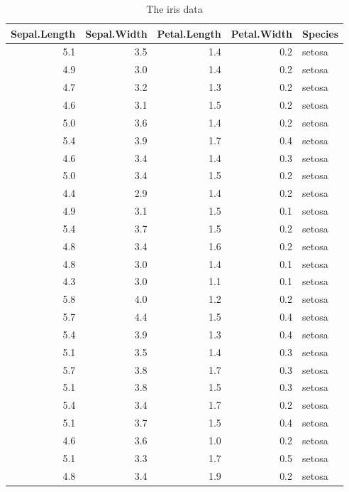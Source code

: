 \documentclass[
  10pt,
]{report}
\begin{document}
\begin{table}[!h]

\caption{\label{tab:iris-data}The iris data}
\centering
\fontsize{8}{10}\selectfont
\begin{tabular}[t]{r|r|r|r|l}
\hline
Sepal.Length & Sepal.Width & Petal.Length & Petal.Width & Species\\
\hline
5.1 & 3.5 & 1.4 & 0.2 & setosa\\
\hline
4.9 & 3.0 & 1.4 & 0.2 & setosa\\
\hline
4.7 & 3.2 & 1.3 & 0.2 & setosa\\
\hline
4.6 & 3.1 & 1.5 & 0.2 & setosa\\
\hline
5.0 & 3.6 & 1.4 & 0.2 & setosa\\
\hline
5.4 & 3.9 & 1.7 & 0.4 & setosa\\
\hline
4.6 & 3.4 & 1.4 & 0.3 & setosa\\
\hline
5.0 & 3.4 & 1.5 & 0.2 & setosa\\
\hline
4.4 & 2.9 & 1.4 & 0.2 & setosa\\
\hline
4.9 & 3.1 & 1.5 & 0.1 & setosa\\
\hline
5.4 & 3.7 & 1.5 & 0.2 & setosa\\
\hline
4.8 & 3.4 & 1.6 & 0.2 & setosa\\
\hline
4.8 & 3.0 & 1.4 & 0.1 & setosa\\
\hline
4.3 & 3.0 & 1.1 & 0.1 & setosa\\
\hline
5.8 & 4.0 & 1.2 & 0.2 & setosa\\
\hline
5.7 & 4.4 & 1.5 & 0.4 & setosa\\
\hline
5.4 & 3.9 & 1.3 & 0.4 & setosa\\
\hline
5.1 & 3.5 & 1.4 & 0.3 & setosa\\
\hline
5.7 & 3.8 & 1.7 & 0.3 & setosa\\
\hline
5.1 & 3.8 & 1.5 & 0.3 & setosa\\
\hline
5.4 & 3.4 & 1.7 & 0.2 & setosa\\
\hline
5.1 & 3.7 & 1.5 & 0.4 & setosa\\
\hline
4.6 & 3.6 & 1.0 & 0.2 & setosa\\
\hline
5.1 & 3.3 & 1.7 & 0.5 & setosa\\
\hline
4.8 & 3.4 & 1.9 & 0.2 & setosa\\
\hline
\end{tabular}
\end{table}
\end{document}
